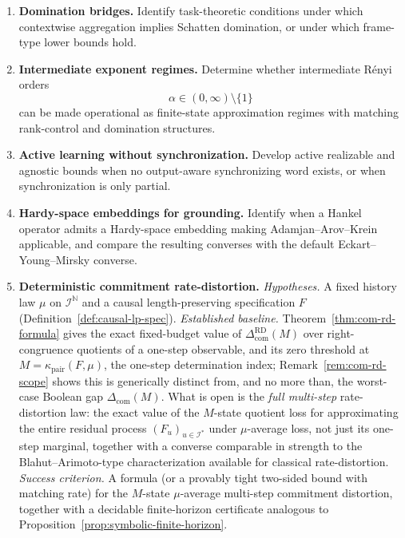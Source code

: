 \documentclass[12pt]{article}
\theoremstyle{definition}
\newcommand{\Com}{\Delta_{\mathrm{com}}}
\newcommand{\Comex}{\Com}
\newcommand{\ComRD}{\Delta_{\mathrm{com}}^{\mathrm{RD}}}
\begin{document}
\begin{enumerate}[leftmargin=2.0em]
\item \textbf{Domination bridges.}
Identify task-theoretic conditions under which contextwise aggregation
implies Schatten domination, or under which frame-type lower bounds hold.

\item \textbf{Intermediate exponent regimes.}
Determine whether intermediate R\'enyi orders
\[
\alpha\in(0,\infty)\setminus\{1\}
\]
can be made operational as finite-state approximation regimes with matching
rank-control and domination structures.

\item \textbf{Active learning without synchronization.}
Develop active realizable and agnostic bounds when no output-aware
synchronizing word exists, or when synchronization is only partial.

\item \textbf{Hardy-space embeddings for grounding.}
Identify when a Hankel operator admits a Hardy-space embedding making
Adamjan--Arov--Krein applicable, and compare the resulting converses with
the default Eckart--Young--Mirsky converse.

\item \textbf{Deterministic commitment rate-distortion.}
\emph{Hypotheses.} A fixed history law $\mu$ on $\mathcal I^{\mathbb N}$ and a
causal length-preserving specification $F$ (Definition~\ref{def:causal-lp-spec}).
\emph{Established baseline.} Theorem~\ref{thm:com-rd-formula} gives the exact
fixed-budget value of $\ComRD(M)$ over right-congruence quotients of a
one-step observable, and its zero threshold at
$M=\kappa_{\mathrm{pair}}(F,\mu)$, the one-step determination index; Remark~\ref{rem:com-rd-scope} shows
this is generically distinct from, and no more than, the worst-case Boolean
gap $\Comex(M)$.  What is open is the \emph{full multi-step} rate-distortion
law: the exact value of the $M$-state quotient loss for approximating the
entire residual process $(F_u)_{u\in\mathcal I^*}$ under $\mu$-average loss,
not just its one-step marginal, together with a converse comparable in
strength to the Blahut--Arimoto-type characterization available for classical
rate-distortion.
\emph{Success criterion.} A formula (or a provably tight two-sided bound with
matching rate) for the $M$-state $\mu$-average multi-step commitment
distortion, together with a decidable finite-horizon certificate analogous to
Proposition~\ref{prop:symbolic-finite-horizon}.


\end{enumerate}
\end{document}

